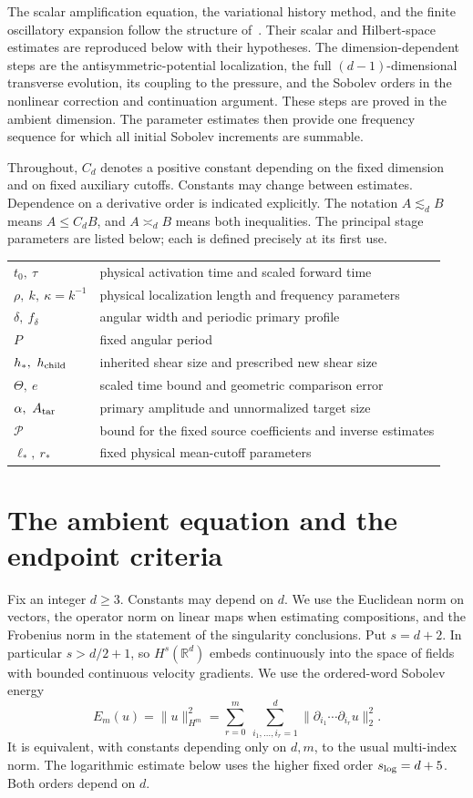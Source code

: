 \documentclass[11pt]{article}
\newcommand{\R}{\mathbb R}
\theoremstyle{definition}
\begin{document}
The scalar amplification equation, the variational history method, and
the finite oscillatory expansion follow the structure of~\cite{OAI}.
Their scalar and Hilbert-space estimates are reproduced below with their
hypotheses. The dimension-dependent steps are the antisymmetric-potential
localization, the full $(d-1)$-dimensional transverse evolution, its
coupling to the pressure, and the Sobolev orders in the nonlinear
correction and continuation argument. These steps are proved in the
ambient dimension. The parameter estimates then provide one frequency
sequence for which all initial Sobolev increments are summable.

Throughout, $C_d$ denotes a positive constant depending on the fixed
dimension and on fixed auxiliary cutoffs. Constants may change between
estimates. Dependence on a derivative order is indicated explicitly.
The notation $A\lesssim_d B$ means $A\leq C_d B$, and
$A\asymp_d B$ means both inequalities. The principal stage parameters are
listed below; each is defined precisely at its first use.
\begin{center}
\renewcommand{\arraystretch}{1.15}
\begin{tabular}{@{}ll@{}}
$t_0,\ \tau$ & physical activation time and scaled forward time\\
$\rho,\ k,\ \kappa=k^{-1}$ & physical localization length and frequency parameters\\
$\delta,\ f_\delta$ & angular width and periodic primary profile\\
$P$ & fixed angular period\\
$h_*,\ h_{\rm child}$ & inherited shear size and prescribed new shear size\\
$\Theta,\ e$ & scaled time bound and geometric comparison error\\
$\alpha,\ A_{\rm tar}$ & primary amplitude and unnormalized target size\\
$\mathcal P$ & bound for the fixed source coefficients and inverse estimates\\
$\ell_*,\ r_*$ & fixed physical mean-cutoff parameters
\end{tabular}
\end{center}

\section{The ambient equation and the endpoint criteria}
Fix an integer $d\geq3$. Constants may depend on $d$.
We use the Euclidean norm on vectors, the operator norm on linear maps when
estimating compositions, and the Frobenius norm in the statement of the
singularity conclusions. Put $s=d+2$. In particular $s>d/2+1$, so
$H^s(\R^d)$ embeds continuously into the space of fields with bounded
continuous velocity gradients. We use the
ordered-word Sobolev energy
\[
 E_m(u)=\|u\|_{H^m}^2
 =\sum_{r=0}^m\ \sum_{i_1,\ldots,i_r=1}^d
   \|\partial_{i_1}\cdots\partial_{i_r}u\|_2^2.
\]
It is equivalent, with constants depending only on $d,m$, to the usual
multi-index norm. The logarithmic estimate below uses the higher fixed
order $s_{\rm log}=d+5$. Both orders depend on $d$.
\end{document}
